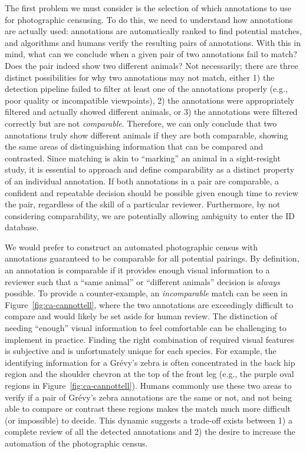 The first problem we must consider is the selection of which annotations to use for photographic censusing.  To do this, we need to understand how annotations are actually used: annotations are automatically ranked to find potential matches, and algorithms and humans verify the resulting pairs of annotations.  With this in mind, what can we conclude when a given pair of two annotations fail to match?  Does the pair indeed show two different animals?  Not necessarily; there are three distinct possibilities for why two annotations may not match, either 1) the detection pipeline failed to filter at least one of the annotations properly (e.g., poor quality or incompatible viewpoints), 2) the annotations were appropriately filtered and actually showed different animals, or 3) the annotations were filtered correctly but are not \textit{comparable}.  Therefore, we can only conclude that two annotations truly show different animals if they are both comparable, showing the same areas of distinguishing information that can be compared and contrasted.  Since matching is akin to ``marking'' an animal in a sight-resight study, it is essential to approach and define comparability as a distinct property of an individual annotation.  If both annotations in a pair are comparable, a confident and repeatable decision should be possible given enough time to review the pair, regardless of the skill of a particular reviewer.  Furthermore, by not considering comparability, we are potentially allowing ambiguity to enter the ID database.

We would prefer to construct an automated photographic census with annotations guaranteed to be comparable for all potential pairings.  By definition, an annotation is comparable if it provides enough visual information to a reviewer such that a ``same animal'' or ``different animals'' decision is \textit{always} possible.  To provide a counter-example, an \textit{incomparable} match can be seen in Figure~\ref{fig:ca-cannottell}, where the two annotations are exceedingly difficult to compare and would likely be set aside for human review.  The distinction of needing ``enough'' visual information to feel comfortable can be challenging to implement in practice.  Finding the right combination of required visual features is subjective and is unfortunately unique for each species.  For example, the identifying information for a Gr\'evy's zebra is often concentrated in the back hip region and the shoulder chevron at the top of the front leg (e.g., the purple oval regions in Figure~\ref{fig:ca-cannottell}).  Humans commonly use these two areas to verify if a pair of Gr\'evy's zebra annotations are the same or not, and not being able to compare or contrast these regions makes the match much more difficult (or impossible) to decide.  This dynamic suggests a trade-off exists between 1) a complete review of all the detected annotations and 2) the desire to increase the automation of the photographic census.

